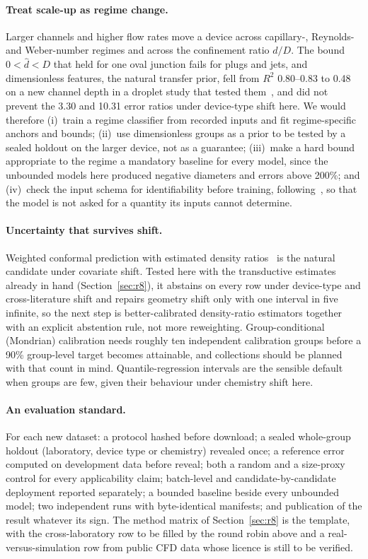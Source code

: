 \documentclass[11pt,a4paper]{article}
\begin{document}
\paragraph{Treat scale-up as regime change.} Larger channels and higher flow
rates move a device across capillary-, Reynolds- and Weber-number regimes and
across the confinement ratio $d/D$. The bound $0<\hat d<D$ that held for one
oval junction fails for plugs and jets, and dimensionless features, the
natural transfer prior, fell from $R^2$ 0.80--0.83 to 0.48 on a new channel
depth in a droplet study that tested them~\cite{labchip2025dimless}, and did
not prevent the 3.30 and 10.31 error ratios under device-type shift here. We would therefore (i)~train a
regime classifier from recorded inputs and fit regime-specific anchors and
bounds; (ii)~use dimensionless groups as a prior to be tested by a sealed
holdout on the larger device, not as a guarantee; (iii)~make a hard bound
appropriate to the regime a mandatory baseline for every model, since the
unbounded models here produced negative diameters and errors above 200\%;
and (iv)~check the input schema for identifiability before training,
following~\cite{cieslak2026}, so that the model is not asked for a quantity
its inputs cannot determine.

\paragraph{Uncertainty that survives shift.} Weighted conformal prediction
with estimated density ratios~\cite{tibshirani2019} is the natural candidate
under covariate shift. Tested here with the transductive estimates already in
hand (Section~\ref{sec:r8}), it abstains on every row under device-type and
cross-literature shift and repairs geometry shift only with one interval in
five infinite, so the next step is better-calibrated density-ratio estimators
together with an explicit abstention rule, not more reweighting.
Group-conditional (Mondrian) calibration needs roughly ten independent
calibration groups before a 90\% group-level target becomes attainable, and
collections should be planned with that count in mind. Quantile-regression
intervals are the sensible default when groups are few, given their behaviour
under chemistry shift here.

\paragraph{An evaluation standard.} For each new dataset: a protocol hashed
before download; a sealed whole-group holdout (laboratory, device type or
chemistry) revealed once; a reference error computed on development data
before reveal; both a random and a size-proxy control for every
applicability claim; batch-level and candidate-by-candidate deployment
reported separately; a bounded baseline beside every unbounded model; two
independent runs with byte-identical manifests; and publication of the
result whatever its sign. The method matrix of Section~\ref{sec:r8} is the
template, with the cross-laboratory row to be filled by the round robin above
and a real-versus-simulation row from public CFD data whose licence is still
to be verified.
\end{document}
